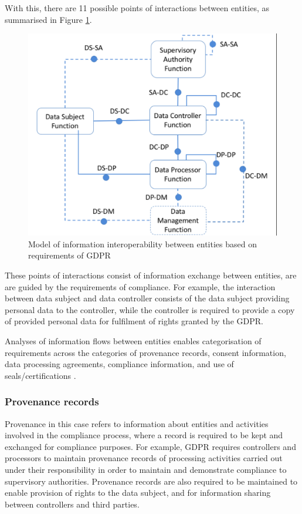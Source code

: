 With this, there are 11 possible points of interactions between entities, as summarised in Figure \ref{fig:info:interoperability-model}.
\begin{figure}[htbp]
    \centering
    \includegraphics[width=0.75\linewidth]{img/interoperability-model.png}
    \caption{Model of information interoperability between entities based on requirements of GDPR \cite{pandit_exploration_2018}}
    \label{fig:info:interoperability-model}
\end{figure}
These points of interactions consist of information exchange between entities, are are guided by the requirements of compliance. For example, the interaction between data subject and data controller consists of the data subject providing personal data to the controller, while the controller is required to provide a copy of provided personal data for fulfilment of rights granted by the GDPR.

Analyses of information flows between entities enables categorisation of requirements across the categories of provenance records, consent information, data processing agreements, compliance information, and use of seals/certifications \cite{pandit_exploration_2018}.

\subsubsection{Provenance records}
Provenance in this case refers to information about entities and activities involved in the compliance process, where a record is required to be kept and exchanged for compliance purposes. For example, GDPR requires controllers and processors to maintain provenance records of processing activities carried out under their responsibility in order to maintain and demonstrate compliance to supervisory authorities. Provenance records are also required to be maintained to enable provision of rights to the data subject, and for information sharing between controllers and third parties.

